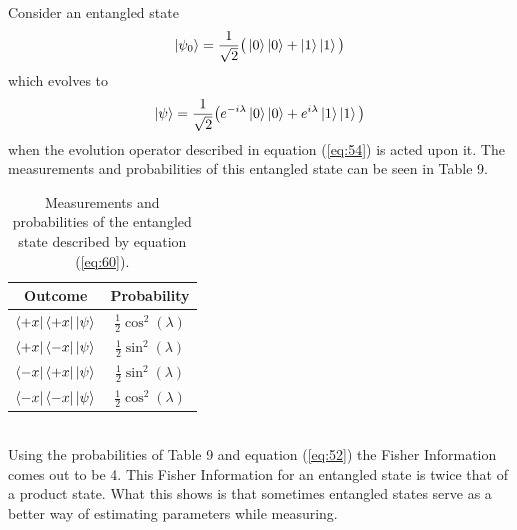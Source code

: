 \documentclass[twocolumn]{article}
\begin{document}
Consider an entangled state
\begin{equation} \label{eq:60}
\ket{\psi_0}=\frac{1}{\sqrt{2}}\big(\ket{0}\ket{0}+\ket{1}\ket{1}\big)
\end{equation}
which evolves to 
\begin{equation} \label{eq:61}
\ket{\psi}=\frac{1}{\sqrt{2}}\big(e^{-i\lambda}\ket{0}\ket{0}+e^{i\lambda}\ket{1}\ket{1}\big)
\end{equation}
when the evolution operator described in equation (\ref{eq:54}) is acted upon it. The measurements and probabilities of this entangled state can be seen in Table 9.
\begin{table}[h!]
\begin{center}
\begin{tabular}{ |c|c| }
\hline Outcome & Probability \\
\hline $\bra{+x}\bra{+x}\ket{\psi}$ & $\frac{1}{2}\cos^2{(\lambda)}$ \\
\hline $\bra{+x}\bra{-x}\ket{\psi}$ & $\frac{1}{2}\sin^2{(\lambda)}$ \\
\hline $\bra{-x}\bra{+x}\ket{\psi}$ & $\frac{1}{2}\sin^2{(\lambda)}$ \\
\hline $\bra{-x}\bra{-x}\ket{\psi}$ & $\frac{1}{2}\cos^2{(\lambda)}$ \\
\hline
\end{tabular}
\caption{Measurements and probabilities of the entangled state described by equation (\ref{eq:60}).}
\end{center}
\end{table} \\
Using the probabilities of Table 9 and equation (\ref{eq:52}) the Fisher Information comes out to be 4. This Fisher Information for an entangled state is twice that of a product state. What this shows is that sometimes entangled states serve as a better way of estimating parameters while measuring.
\end{document}
